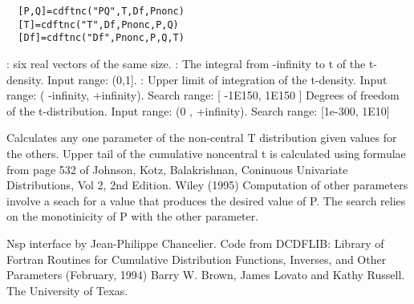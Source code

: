 \begin{mandesc}
\end{mandesc}
\label{cdftnc}
\begin{calling_sequence}
\begin{verbatim}
  [P,Q]=cdftnc("PQ",T,Df,Pnonc)  
  [T]=cdftnc("T",Df,Pnonc,P,Q)  
  [Df]=cdftnc("Df",Pnonc,P,Q,T)  
\end{verbatim}
\end{calling_sequence}
\begin{parameters}
  \begin{varlist}
     : six real vectors of the same size.
     : The integral from -infinity to t of the t-density. Input range: (0,1].
       : Upper limit of integration of the t-density. Input range: ( -infinity, +infinity). Search range: [ -1E150, 1E150 ]
       Degrees of freedom of the t-distribution. Input range: (0 , +infinity). Search range: [1e-300, 1E10]
  \end{varlist}
\end{parameters}
\begin{mandescription}
  Calculates any one parameter of the non-central T distribution given
  values for the others.
  Upper tail    of  the  cumulative  noncentral t is calculated using 
  formulae  from page 532  of Johnson, Kotz,  Balakrishnan, Coninuous 
  Univariate Distributions, Vol 2, 2nd Edition.  Wiley (1995) 
  Computation of other parameters involve a seach for a value that 
  produces  the desired  value  of P.   The search relies  on  the 
  monotinicity of P with the other parameter. 
\end{mandescription}

\begin{authors}
  Nsp interface by Jean-Philippe Chancelier. Code from DCDFLIB: 
  Library of Fortran Routines for Cumulative Distribution
  Functions, Inverses, and Other Parameters (February, 1994)
  Barry W. Brown, James Lovato and Kathy Russell. The University of Texas.
\end{authors}
